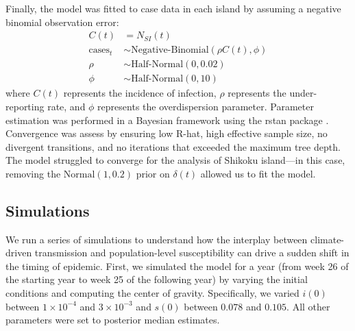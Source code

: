 \documentclass[12pt]{article}
\begin{document}
Finally, the model was fitted to case data in each island by assuming a negative binomial observation error:
\begin{align}
C(t) &= N_{SI}(t)\\
\textrm{cases}_t &\sim \textrm{Negative-Binomial}(\rho C(t), \phi)\\
\rho &\sim \textrm{Half-Normal}(0, 0.02)\\
\phi &\sim \textrm{Half-Normal}(0, 10)
\end{align}
where $C(t)$ represents the incidence of infection, $\rho$ represents the under-reporting rate, and $\phi$ represents the overdispersion parameter.
Parameter estimation was performed in a Bayesian framework using the rstan package \citep{carpenter2017stan}.
Convergence was assess by ensuring low R-hat, high effective sample size, no divergent transitions, and no iterations that exceeded the maximum tree depth.
The model struggled to converge for the analysis of Shikoku island---in this case, removing the $\mathrm{Normal}(1, 0.2)$ prior on $\delta(t)$ allowed us to fit the model.

\subsection*{Simulations}

We run a series of simulations to understand how the interplay between climate-driven transmission and population-level susceptibility can drive a sudden shift in the timing of epidemic.
First, we simulated the model for a year (from week 26 of the starting year to week 25 of the following year) by varying the initial conditions and computing the center of gravity.
Specifically, we varied $i(0)$ between $1\times 10^{-4}$ and $3\times 10^{-3}$ and $s(0)$ between $0.078$ and $0.105$.
All other parameters were set to posterior median estimates.
\end{document}
